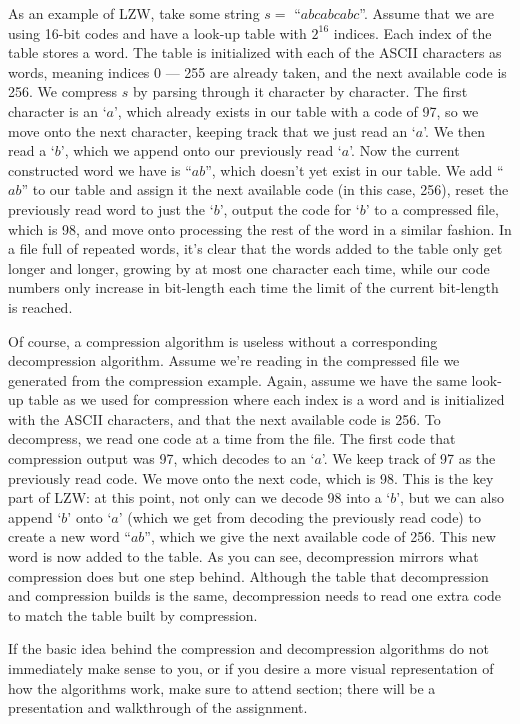 \documentclass{article}
\begin{document}
As an example of LZW, take some string $s =$ ``$abcabcabc$''. Assume that we are
using 16-bit codes and have a look-up table with $2^{16}$ indices. Each index of
the table stores a word. The table is initialized with each of the ASCII
characters as words, meaning indices 0 --- 255 are already taken, and the next
available code is 256.  We compress $s$ by parsing through it character by
character. The first character is an `$a$', which already exists in our table
with a code of 97, so we move onto the next character, keeping track that we
just read an `$a$'. We then read a `$b$', which we append onto our previously
read `$a$'. Now the current constructed word we have is ``$ab$'', which doesn't
yet exist in our table. We add ``$ab$'' to our table and assign it the next
available code (in this case, 256), reset the previously read word to just the
`$b$', output the code for `$b$' to a compressed file, which is 98, and move
onto processing the rest of the word in a similar fashion. In a file full of
repeated words, it's clear that the words added to the table only get longer and
longer, growing by at most one character each time, while our code numbers only
increase in bit-length each time the limit of the current bit-length is reached.

Of course, a compression algorithm is useless without a corresponding
decompression algorithm. Assume we're reading in the compressed file we
generated from the compression example. Again, assume we have the same look-up
table as we used for compression where each index is a word and is initialized
with the ASCII characters, and that the next available code is 256. To
decompress, we read one code at a time from the file. The first code that
compression output was 97, which decodes to an `$a$'. We keep track of 97 as the
previously read code. We move onto the next code, which is 98. This is the key
part of LZW: at this point, not only can we decode 98 into a `$b$', but we can
also append `$b$' onto `$a$' (which we get from decoding the previously read
code) to create a new word ``$ab$'', which we give the next available code of
256. This new word is now added to the table. As you can see, decompression
mirrors what compression does but one step behind. Although the table that
decompression and compression builds is the same, decompression needs to read
one extra code to match the table built by compression.

If the basic idea behind the compression and decompression algorithms do not
immediately make sense to you, or if you desire a more visual representation of
how the algorithms work, make sure to attend section; there will be a
presentation and walkthrough of the assignment.
\end{document}
